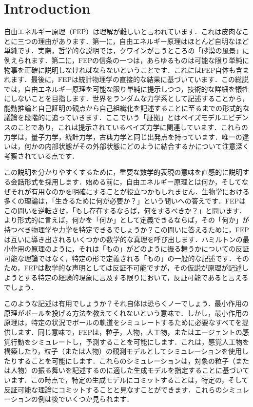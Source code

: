 \documentclass[a4paper, titlepage]{jsarticle}
\begin{document}
\section{Introduction}
自由エネルギー原理（FEP）は理解が難しいと言われています．これは皮肉なことに三つの理由があります．第一に，自由エネルギー原理はほとんど自明なほど単純です．実際，哲学的な説明では，クワインが言うところの「砂漠の風景」に例えられます．第二に，FEPの信条の一つは，あらゆるものは可能な限り単純に物事を正確に説明しなければならないということです．これにはFEP自体も含まれます．最後に，FEPは統計物理学の直接的な結果に基づいています．この総説では，自由エネルギー原理を可能な限り単純に提示しつつ，技術的な詳細を犠牲にしないことを目指します．世界をランダムな力学系として記述することから，能動推論と自己証明の観点から自己組織化を記述することに至るまでの形式的な議論を段階的に追っていきます．ここでいう「証拠」とはベイズモデルエビデンスのことであり，これは提示されているベイズ力学に関連しています．これらの力学は，量子力学，統計力学，古典力学と同じ出発点を持っています．唯一の違いは，何かの内部状態がその外部状態にどのように結合するかについて注意深く考察されている点です．
\par
この説明を分かりやすくするために，重要な数学的表現の意味を直感的に説明する会話形式を採用します．始める前に，自由エネルギー原理とは何か，そしてなぜそれが有用なのかを明確にすることが役立つかもしれません．生物学における多くの理論は，「生きるために何が必要か？」という問いへの答えです．FEPはこの問いを逆転させ，「もし存在するならば，何をするべきか？」と問います．より形式的に言えば，何かを「何か」として定義できるならば，その「何か」が持つべき物理学や力学を特定できるでしょうか？この問いに答えるために，FEPは互いに導き出されるいくつかの数学的な真理を呼び出します．ハミルトンの最小作用の原理のように，それは「もの」がどのように振る舞うかについての反証可能な理論ではなく，特定の形で定義される「もの」の一般的な記述です．そのため，FEPは数学的な声明としては反証不可能ですが，その仮説が原理が記述しようとする特定の経験的現象に言及する限りにおいて，反証可能であると言えるでしょう．
\par
このような記述は有用でしょうか？それ自体は恐らくノーでしょう．最小作用の原理がボールを投げる方法を教えてくれないという意味で．しかし，最小作用の原理は，特定の状況でボールの軌道をシミュレートするために必要なすべてを提供します．同じ意味で，FEPは，粒子，人物，人工物，またはエージェントの感覚行動をシミュレートし，予測することを可能にします．これは，感覚人工物を構築したり，粒子（または人物）の観測モデルとしてシミュレーションを使用したりすることを可能にします．これらのシミュレーションは，対象の粒子（または人物）の振る舞いを記述するのに適した生成モデルを指定することに基づいています．この時点で，特定の生成モデルにコミットすることは，特定の，そして反証可能な理論にコミットすることと見なすことができます．これらのシミュレーションの例は後でいくつか見られます．
\end{document}
